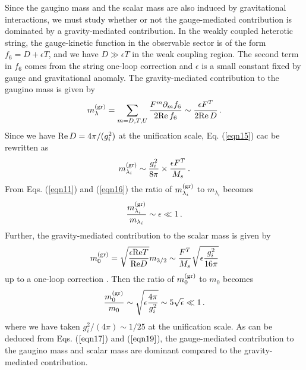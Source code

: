 Since the gaugino mass and the scalar mass are also induced by
gravitational interactions, 
we must study whether or not the gauge-mediated contribution 
is dominated by a gravity-mediated contribution. 
In the weakly coupled heterotic string, 
the gauge-kinetic function in the observable sector is of the form 
$f_6= D + \epsilon T$, and 
we have $D \gg \epsilon T$ in the weak coupling region. 
The second term in $f_6$ comes from the string one-loop correction 
and $\epsilon$ is a small constant fixed by gauge and gravitational
anomaly\cite{kahler}\cite{f6}. 
The gravity-mediated contribution to the gaugino mass is given by 
\begin{equation}
    m_{\lambda}^{\rm (gr)} = \sum_{m = D,T,U} \frac{F^{m}\partial_{m}f_{6}}
                            {2{\rm Re}\,f_{6}}
                  \sim \frac{\epsilon F^{T}}{2{\rm Re}\,D}\,. 
\label{eqn15}
\end{equation}
Since we have ${\rm Re}\,D = 4\pi/(g_i^2)$ at the unification 
scale, 
Eq. (\ref{eqn15}) cac be rewritten as 
\begin{equation}
    m_{\lambda_i}^{\rm (gr)} \sim 
           \frac{g_i^2}{8\pi} \times \frac {\epsilon F^T}{M_s}\,. 
\label{eqn16}
\end{equation}
From Eqs. (\ref{eqn11}) and (\ref{eqn16}) 
the ratio of $m_{\lambda_i}^{\rm (gr)}$ to $m_{\lambda_{i}}$ becomes
\begin{equation}
    \frac{m_{\lambda _i}^{\rm (gr)}}{m_{\lambda_i}}
                \sim \epsilon \ll 1\,. 
\label{eqn17}
\end{equation}
Further, the gravity-mediated contribution to the scalar mass
is given by
\begin{equation}
 m_{0}^{\rm (gr)}=\sqrt{\frac{\epsilon {\rm Re}T}{{\rm Re}D}}m_{3/2}\sim
             \frac{F^{T}}{M_{s}}\sqrt{\epsilon\frac{g^{2}_{i}}{16\pi}}
 \label{eqn18}
\end{equation}
up to a one-loop correction \cite{problem}.
Then the ratio of $m_{0}^{\rm (gr)}$ to $m_{0}$ becomes
\begin{equation}
 \frac{m_{0}^{\rm (gr)}}{m_{0}}\sim
 \sqrt{\epsilon\frac{4\pi}{g^{2}_{i}}}\sim 5\sqrt{\epsilon}\ll 1\,.
 \label{eqn19}
\end{equation}
where we have taken $g^{2}_{i}/(4\pi)\sim 1/25$ at the unification scale.
As can be deduced from Eqs. ($\ref{eqn17}$) and ($\ref{eqn19}$), 
the gauge-mediated contribution to the gaugino mass
and scalar mass are dominant compared to the gravity-mediated
contribution. 

